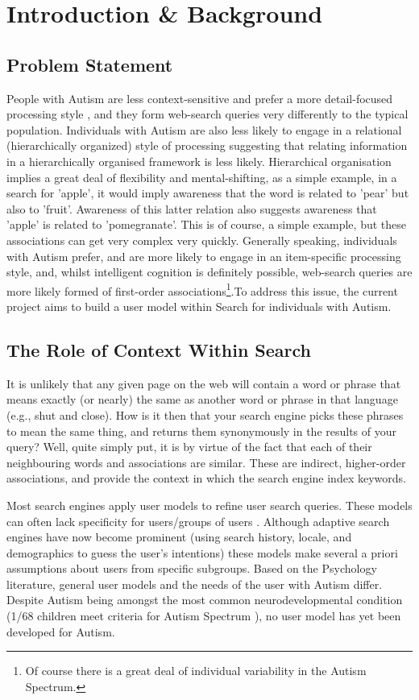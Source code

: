 \documentclass[a4paper, 10pt]{article}
\begin{document}
\clearpage

\section{Introduction \& Background}
\subsection{Problem Statement} \label{prob}
People with Autism are less context-sensitive and prefer a more detail-focused processing style \cite{mottron}, and they form web-search queries very differently to the typical population. Individuals with Autism are also less likely to engage in a relational (hierarchically organized) style of processing \cite{bowler} suggesting that relating information in a hierarchically organised framework is less likely. Hierarchical organisation implies a great deal of flexibility and mental-shifting, as a simple example, in a search for 'apple', it would imply awareness that the word is related to 'pear' but also to 'fruit'. Awareness of this latter relation also suggests awareness that 'apple' is related to 'pomegranate'. This is of course, a simple example, but these associations can get very complex very quickly. Generally speaking, individuals with Autism prefer, and are more likely to engage in an item-specific processing style, and, whilst intelligent cognition is definitely possible, web-search queries are more likely formed of first-order associations\footnote{Of course there is a great deal of individual variability in the Autism Spectrum.}.To address this issue, the current project aims to build a user model within Search for individuals with Autism. 

\subsection{The Role of Context Within Search} \label{the problem}
It is unlikely that any given page on the web will contain a word or phrase that means exactly (or nearly) the same as another word or phrase in that language (e.g., shut and close). How is it then that your search engine picks these phrases to mean the same thing, and returns them synonymously in the results of your query? Well, quite simply put, it is by virtue of the fact that each of their neighbouring words and associations are similar. These are indirect, higher-order associations, and provide the context in which the search engine index keywords.

Most search engines apply user models to refine user search queries. These models can often lack specificity for users/groups of users \cite{usermodel}. Although adaptive search engines have now become prominent (using search history, locale, and demographics to guess the user's intentions) these models make several a priori assumptions about users from specific subgroups. Based on the Psychology literature, general user models and the needs of the user with Autism differ. Despite Autism being amongst the most common neurodevelopmental condition (1/68 children meet criteria for Autism Spectrum \cite{CDC}), no user model has yet been developed for Autism. 
\end{document}
